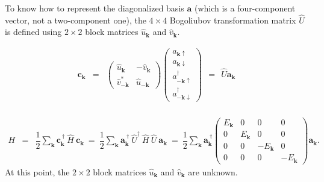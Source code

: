 \documentclass[uplatex,a4j,12pt,dvipdfmx]{jsarticle}
\begin{document}
To know how to represent the diagonalized basis $\bm{a}$ (which is a four-component vector, not a two-component one), the $4 \times 4$ Bogoliubov transformation matrix $\hat{U}$ is defined using $2 \times 2$ block matrices $\hat{u}_{\bm{k}}$ and $\hat{v}_{\bm{k}}$.

\begin{eqnarray}
	\bm{c}_{\bm{k}}
	&=&
	\left(
	\begin{array}{cc}
			\hat{u}_{\bm{k}}       & - \hat{v}_{\bm{k}} \\[3mm]
			\hat{v}_{- \bm{k}}^{*} & \hat{u}_{- \bm{k}}
		\end{array}
	\right)
	\!\!\!
	\left(
	\begin{array}{c}
			a_{\bm{k} \uparrow}            \\[2mm]
			a_{\bm{k} \downarrow}          \\[2mm]
			a^{\dagger}_{-\bm{k} \uparrow} \\[2mm]
			a^{\dagger}_{-\bm{k} \downarrow}
		\end{array}
	\right)
	\ \ = \ \
	\hat{U}
	\bm{a}_{\bm{k}}
\end{eqnarray}
%
\ \\[-10mm]

\begin{eqnarray}
	H
	&=&
	\dfrac{1}{2}
	\sum_{\bm{k}}
	\bm{c}^{\ \dagger}_{\bm{k}}
	\
	\hat{H}
	\
	\bm{c}_{\bm{k}}
	\ = \
	\dfrac{1}{2}
	\sum_{\bm{k}}
	\bm{a}^{\ \dagger}_{\bm{k}}
	\
	\hat{U}^{\dagger}
	\
	\hat{H}
	\
	\hat{U}
	\
	\bm{a}_{\bm{k}}
	\ = \
	\dfrac{1}{2}
	\sum_{\bm{k}}
	\bm{a}^{\ \dagger}_{\bm{k}}
	\left(
	\begin{array}{cccc}
			E_{\bm{k}} & 0          & 0            & 0
			\\[3mm]
			0          & E_{\bm{k}} & 0            & 0
			\\[3mm]
			0          & 0          & - E_{\bm{k}} & 0
			\\[3mm]
			0          & 0          & 0            & - E_{\bm{k}}
		\end{array}
	\right)
	\bm{a}_{\bm{k}}
	.
\end{eqnarray}
%
At this point, the $2 \times 2$ block matrices $\hat{u}_{\bm{k}}$ and $\hat{v}_{\bm{k}}$ are unknown.
\end{document}
